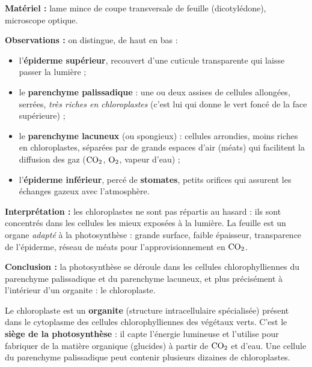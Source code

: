 \documentclass[11pt]{article}
\newcommand{\cle}[1]{{\popxbold\color{popdark}#1}}
\newcounter{popsec}
\newcounter{popsub}
\newcommand{\courssub}[1]{%
  \stepcounter{popsub}%
  \par\vspace{9pt}\noindent{\popxbold\fontsize{11.5}{13}\selectfont\color{popink}{\color{poporange}\thepopsec.\thepopsub}\hspace{6pt}#1}\par\nopagebreak\vspace{4pt}
}
\begin{document}
\begin{experience}
\textbf{Matériel :} lame mince de coupe transversale de feuille (dicotylédone), microscope optique.

\textbf{Observations :} on distingue, de haut en bas :
\begin{itemize}
\item l'\textbf{épiderme supérieur}, recouvert d'une cuticule transparente qui laisse passer la lumière ;
\item le \textbf{parenchyme palissadique} : une ou deux assises de cellules allongées, serrées, \emph{très riches en chloroplastes} (c'est lui qui donne le vert foncé de la face supérieure) ;
\item le \textbf{parenchyme lacuneux} (ou spongieux) : cellules arrondies, moins riches en chloroplastes, séparées par de grands espaces d'air (méats) qui facilitent la diffusion des gaz ($\ce{CO2}$, $\ce{O2}$, vapeur d'eau) ;
\item l'\textbf{épiderme inférieur}, percé de \textbf{stomates}, petits orifices qui assurent les échanges gazeux avec l'atmosphère.
\end{itemize}

\textbf{Interprétation :} les chloroplastes ne sont pas répartis au hasard : ils sont concentrés dans les cellules les mieux exposées à la lumière. La feuille est un organe \emph{adapté} à la photosynthèse : grande surface, faible épaisseur, transparence de l'épiderme, réseau de méats pour l'approvisionnement en $\ce{CO2}$.

\textbf{Conclusion :} la photosynthèse se déroule dans les \cle{cellules chlorophylliennes} du parenchyme palissadique et du parenchyme lacuneux, et plus précisément à l'intérieur d'un organite : le chloroplaste.
\end{experience}

\begin{definition}[Chloroplaste]
Le \cle{chloroplaste} est un \textbf{organite} (structure intracellulaire spécialisée) présent dans le cytoplasme des cellules chlorophylliennes des végétaux verts. C'est le \textbf{siège de la photosynthèse} : il capte l'énergie lumineuse et l'utilise pour fabriquer de la matière organique (glucides) à partir de $\ce{CO2}$ et d'eau. Une cellule du parenchyme palissadique peut contenir plusieurs dizaines de chloroplastes.
\end{definition}

\courssub{Structure du chloroplaste}
\end{document}
